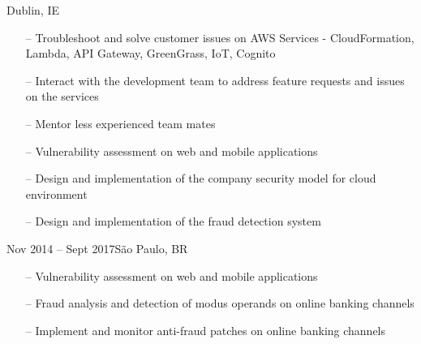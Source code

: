 \documentclass[10pt,a4paper]{altacv}
\begin{document}
\tagline{}

\begin{fullwidth}
\makecvheader
\end{fullwidth}




{Dublin, IE}

\begin{itemize}
    \setlength{\itemindent}{0.5em}
    \item[--]   \small{Troubleshoot and solve customer issues on AWS Services} 
	    \subitem - \small{CloudFormation, Lambda, API Gateway, GreenGrass, 
		IoT, Cognito}
    \item[--]  \small{Interact with the development team to address feature 
	    requests and issues on the services }
    \item[--]   \small{Mentor less experienced team mates}
\end{itemize}

\medskip



\begin{itemize}
    \setlength{\itemindent}{0.5em}
    \item[--]   \small{Vulnerability assessment on web and mobile applications}
    \item[--]   \small{Design and implementation of the company security model 
	    for cloud environment}
    \item[--]   \small{Design and implementation of the fraud detection system}
\end{itemize}


{Nov 2014 -- Sept 2017}{São Paulo, BR}

\begin{itemize}
    \setlength{\itemindent}{0.5em}
    \item[--]   \small{Vulnerability assessment on web and mobile applications}
    \item[--] 	\small{Fraud analysis and detection of modus operands on online 
	    banking channels}
    \item[--]	\small{Implement and monitor anti-fraud patches on online 
	    banking channels }
\end{itemize}
\end{document}

